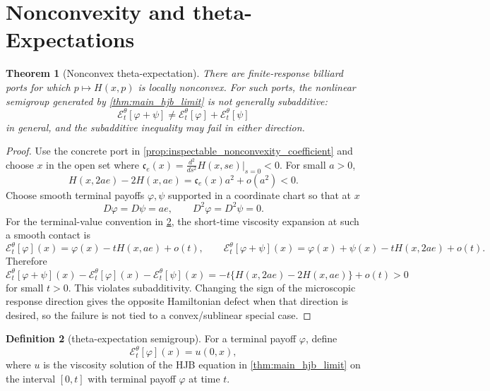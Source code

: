 \documentclass[11pt]{amsart}
\newtheorem{theorem}{Theorem}[section]
\theoremstyle{definition}
\newtheorem{definition}[theorem]{Definition}
\theoremstyle{remark}
\newcommand{\Etheta}{\mathcal E^\theta}
\begin{document}
\section{Nonconvexity and theta-Expectations}

\begin{theorem}[Nonconvex theta-expectation]
\label{thm:nonconvex_theta_expectation}
There are finite-response billiard ports for which $p\mapsto H(x,p)$ is locally
nonconvex.  For such ports, the nonlinear semigroup generated by
\cref{thm:main_hjb_limit} is not generally subadditive:
\begin{equation}
  \Etheta_t[\varphi+\psi]\ne
  \Etheta_t[\varphi]+\Etheta_t[\psi]
\end{equation}
in general, and the subadditive inequality may fail in either direction.
\end{theorem}

\begin{proof}
Use the concrete port in \cref{prop:inspectable_nonconvexity_coefficient} and
choose $x$ in the open set where
\(\mathfrak c_e(x)=\frac{d^2}{ds^2}H(x,se)|_{s=0}<0\).  For small \(a>0\),
\[
  H(x,2ae)-2H(x,ae)=\mathfrak c_e(x)a^2+o(a^2)<0 .
\]
Choose smooth terminal payoffs $\varphi,\psi$ supported in a coordinate chart so
that at $x$
\[
  D\varphi=D\psi=ae,\qquad D^2\varphi=D^2\psi=0.
\]
For the terminal-value convention in \cref{def:theta_expectation_semigroup}, the
short-time viscosity expansion at such a smooth contact is
\[
  \Etheta_t[\varphi](x)=\varphi(x)-tH(x,ae)+o(t),
  \qquad
  \Etheta_t[\varphi+\psi](x)=\varphi(x)+\psi(x)-tH(x,2ae)+o(t).
\]
Therefore
\[
  \Etheta_t[\varphi+\psi](x)-\Etheta_t[\varphi](x)-\Etheta_t[\psi](x)
  =
  -t\{H(x,2ae)-2H(x,ae)\}+o(t)>0
\]
for small $t>0$.  This violates subadditivity.  Changing the sign of the
microscopic response direction gives the opposite Hamiltonian defect when that
direction is desired, so the failure is not tied to a convex/sublinear
special case.
\end{proof}

\begin{definition}[theta-expectation semigroup]
\label{def:theta_expectation_semigroup}
For a terminal payoff $\varphi$, define
\begin{equation}
  \Etheta_t[\varphi](x)=u(0,x),
\end{equation}
where $u$ is the viscosity solution of the HJB equation in
\cref{thm:main_hjb_limit} on the interval $[0,t]$ with terminal payoff
$\varphi$ at time $t$.
\end{definition}
\end{document}
